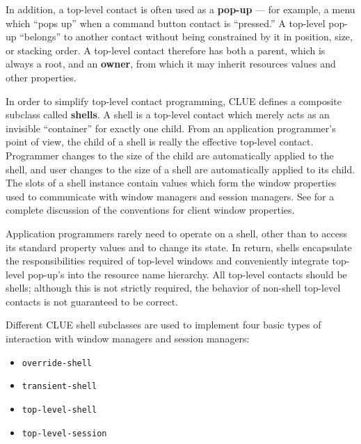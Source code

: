 In addition, a top-level contact is often used as a {\bf pop-up}
--- for example, a menu which ``pops up'' when a command button contact is
``pressed.'' A top-level pop-up ``belongs'' to another contact without being
constrained by it in position, size, or stacking order.  A top-level contact
therefore has both a parent, which is always a root, and an {\bf
owner}, from which it may inherit resources
values and other properties.

In order to simplify top-level contact programming, CLUE defines a composite
subclass called {\bf shells}.  A shell is a top-level contact which
merely acts as an invisible ``container'' for exactly one child.  From an
application programmer's point of view, the child of a shell is really the
effective top-level contact.  Programmer changes to the size of the child are
automatically applied to the shell, and user changes to the size of a shell are
automatically applied to its child.  The slots of a shell instance contain
values which form the window properties used to communicate with window managers
and session managers.  See \cite{icccm} for a complete discussion of the
conventions for client window properties.

Application programmers rarely need to operate on a shell, other than to access
its standard property values and to change its state.  In return, shells
encapsulate the responsibilities required of top-level windows and conveniently
integrate top-level pop-up's into the resource name hierarchy.  All top-level
contacts should be shells; although this is not strictly required, the behavior
of non-shell top-level contacts is not guaranteed to be correct.

Different CLUE shell subclasses are used to implement four basic types
of interaction with window managers and session managers:

\begin{itemize}
\item {\tt override-shell}
\item {\tt transient-shell}
\item {\tt top-level-shell}
\item {\tt top-level-session}
\end{itemize}


